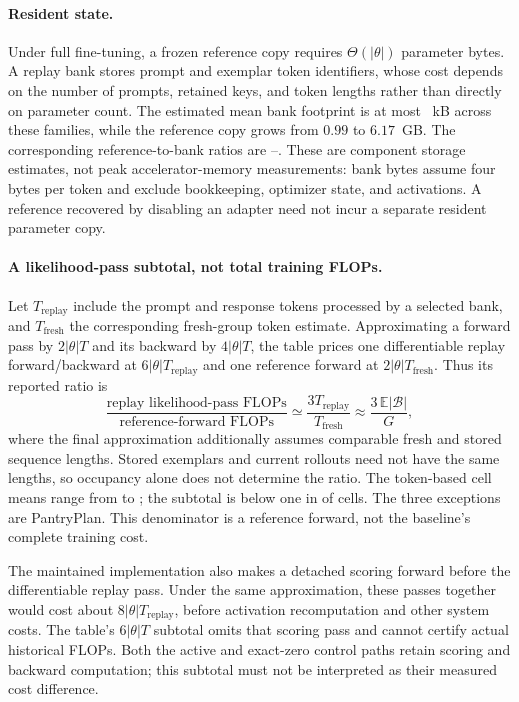 \documentclass{article}
\newcommand{\1}{\mathbf 1}
\newcommand{\E}{\mathbb E}
\theoremstyle{remark}
\theoremstyle{definition}
\theoremstyle{plain}
\begin{document}
\paragraph{Resident state.}
Under full fine-tuning, a frozen reference copy requires
$\Theta(|\theta|)$ parameter bytes. A replay bank stores prompt and exemplar
token identifiers, whose cost depends on the number of prompts, retained
keys, and token lengths rather than directly on parameter count. The
estimated mean bank footprint is at most \MDcostBankKB{}~kB across these
families, while the reference copy grows from $0.99$ to $6.17$~GB. The
corresponding reference-to-bank ratios are \MDcostStateMin{}--\MDcostStateMax{}.
These are component storage estimates, not peak accelerator-memory
measurements: bank bytes assume four bytes per token and exclude bookkeeping,
optimizer state, and activations. A reference recovered by disabling an
adapter need not incur a separate resident parameter copy.

\paragraph{A likelihood-pass subtotal, not total training FLOPs.}
Let $T_{\mathrm{replay}}$ include the prompt and response tokens processed
by a selected bank, and $T_{\mathrm{fresh}}$ the corresponding fresh-group
token estimate. Approximating a forward pass by $2|\theta|T$ and its backward
by $4|\theta|T$, the table prices one differentiable replay forward/backward
at $6|\theta|T_{\mathrm{replay}}$ and one reference forward at
$2|\theta|T_{\mathrm{fresh}}$. Thus its reported ratio is
\begin{equation}
  \frac{\text{replay likelihood-pass FLOPs}}{\text{reference-forward FLOPs}}
  \simeq \frac{3T_{\mathrm{replay}}}{T_{\mathrm{fresh}}}
  \approx \frac{3\,\E|\mathcal B|}{G},
  \label{eq:replay-flop-ratio}
\end{equation}
where the final approximation additionally assumes comparable fresh and
stored sequence lengths. Stored exemplars and current rollouts need not have
the same lengths, so occupancy alone does not determine the ratio. The
token-based cell means range from \MDcostRatioMin{} to \MDcostRatioMax{};
the subtotal is below one in \MDcostCellsBelow{} of \MDcostCellsTotal{} cells.
The three exceptions are PantryPlan. This denominator is a reference
forward, not the baseline's complete training cost.

The maintained implementation also makes a detached scoring forward before
the differentiable replay pass. Under the same approximation, these passes
together would cost about $8|\theta|T_{\mathrm{replay}}$, before activation
recomputation and other system costs. The table's $6|\theta|T$ subtotal omits
that scoring pass and cannot certify actual historical FLOPs. Both the
active and exact-zero control paths retain scoring and backward computation;
this subtotal must not be interpreted as their measured cost difference.
\end{document}

